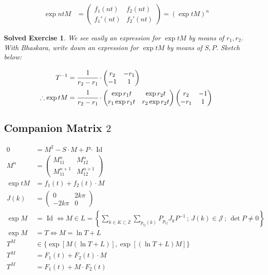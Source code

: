 \documentclass[12pt,a4paper]{article}
\newtheorem*{solved}{Solved Exercise}
\begin{document}
\begin{align}
  \exp ntM &= \left(\begin{matrix}f_1(nt) & f_2(nt) \\ f_1'(nt) & f_2'(nt) \end{matrix}\right) = (\exp tM)^n
\end{align}

\begin{solved}
We see easily an expression for $\exp tM$ by means of $r_1, r_2$. With Bhaskara, write down an expression for $\exp tM$ by means of $S, P$. Sketch below:
\end{solved}

\begin{align}
T^{-1} &= \cfrac{1}{r_2 - r_1} \cdot \left(\begin{matrix}r_2 & -r_1 \\ -1 & 1 \end{matrix}\right) \\
\therefore \exp tM &=  \cfrac{1}{r_2 - r_1} \cdot \left(\begin{matrix}\exp{r_1 t} & \exp{r_2 t} \\ r_1 \exp{r_1 t} & r_2 \exp{r_2 t} \end{matrix}\right) \left(\begin{matrix}r_2 & -1 \\ -r_1 & 1 \end{matrix}\right)
\end{align}

\subsection{Companion Matrix $2$}

\begin{align}
  0 &= M^2 - S\cdot M + P\cdot\text{ Id } \\
  M^n &= \begin{pmatrix} M_{11}^n & M_{12}^n \\ M^{n+1}_{11} & M^{n+1}_{12} \end{pmatrix} \\
  \exp tM &= f_1(t) + f_2(t) \cdot M \\
  J(k) &= \left( \begin{matrix} 0 & 2k\pi \\ -2k\pi & 0 \end{matrix}\right) \label{jota} \\
  \exp M &= \text{ Id } \Leftrightarrow M \in L = \left\{ \sum_{k \in K \subset \mathbb{Z}} \sum_{p_{ij}(k)} P_{p_{ij}} J_k P^{-1} \,;\, J(k) \in \mathcal{J}\,;\,\det P \ne 0 \right\} \\
  \exp M &= T \Leftrightarrow M = \ln T + L \\
  T^M &\in \{ \exp [M (\ln T + L)], \exp [(\ln T + L) M] \} \\
  T^M &= F_1(t) + F_2(t) \cdot M \\
  T^M &= F_1(t) + M \cdot F_2(t)
\end{align}
\end{document}

